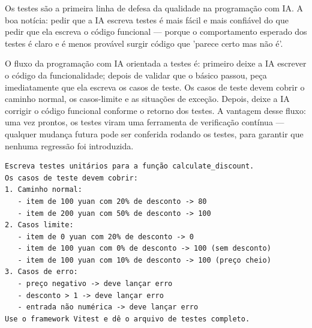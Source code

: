


Os testes são a primeira linha de defesa da qualidade na programação com IA. A boa notícia: pedir que a IA escreva testes é mais fácil e mais confiável do que pedir que ela escreva o código funcional — porque o comportamento esperado dos testes é claro e é menos provável surgir código que 'parece certo mas não é'.

O fluxo da programação com IA orientada a testes é: primeiro deixe a IA escrever o código da funcionalidade; depois de validar que o básico passou, peça imediatamente que ela escreva os casos de teste. Os casos de teste devem cobrir o caminho normal, os casos-limite e as situações de exceção. Depois, deixe a IA corrigir o código funcional conforme o retorno dos testes. A vantagem desse fluxo: uma vez prontos, os testes viram uma ferramenta de verificação contínua — qualquer mudança futura pode ser conferida rodando os testes, para garantir que nenhuma regressão foi introduzida.

\begin{lstlisting}
Escreva testes unitários para a função calculate_discount.
Os casos de teste devem cobrir:
1. Caminho normal:
   - item de 100 yuan com 20% de desconto -> 80
   - item de 200 yuan com 50% de desconto -> 100
2. Casos limite:
   - item de 0 yuan com 20% de desconto -> 0
   - item de 100 yuan com 0% de desconto -> 100 (sem desconto)
   - item de 100 yuan com 10% de desconto -> 100 (preço cheio)
3. Casos de erro:
   - preço negativo -> deve lançar erro
   - desconto > 1 -> deve lançar erro
   - entrada não numérica -> deve lançar erro
Use o framework Vitest e dê o arquivo de testes completo.
\end{lstlisting}

